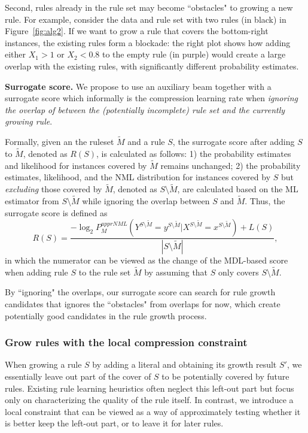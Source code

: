 Second, rules already in the rule set may become ``obstacles" to growing a new rule. For example, consider the data and rule set with two rules (in black) in Figure~\ref{fig:alg2}. If we want to grow a rule that covers the bottom-right instances, the existing rules form a blockade: the right plot shows how adding either $X_1 > 1$ or $X_2 < 0.8$ to the empty rule (in purple) would create a large overlap with the existing rules, with significantly different probability estimates.

\noindent \textbf{Surrogate score.}
We propose to use an auxiliary beam together with a surrogate score which informally is the compression learning rate when \emph{ignoring the overlap of between the (potentially incomplete) rule set and the currently growing rule}. 

Formally, given an the ruleset $\tilde{M}$ and a rule $S$, the surrogate score after adding $S$ to $\tilde{M}$, denoted as $R(S)$, is calculated as follows: 1) the probability estimates and likelihood for instances covered by $\tilde{M}$ remains unchanged; 2) the probability estimates, likelihood, and the NML distribution for instances covered by $S$ but \emph{excluding} those covered by $\tilde{M}$, denoted as $S \setminus \tilde{M}$, are calculated based on the ML estimator from $S \setminus \tilde{M}$ while ignoring the overlap between $S$ and $\tilde{M}$. Thus, the surrogate score is defined as 
\begin{equation} \label{eq:surrogate_learning_rate}
	R(S) = \frac{-\log_2 P_M^{apprNML}(Y^{S \setminus \tilde{M}} = y^{S \setminus \tilde{M}} | X^{S \setminus \tilde{M}} = x^{S \setminus \tilde{M}}) + L(S)} {|S \setminus \tilde{M}|},
\end{equation}
in which the numerator can be viewed as the change of the MDL-based score when adding rule $S$ to the rule set $\tilde{M}$ by assuming that $S$ only covers $S \setminus \tilde{M}$. 

By ``ignoring" the overlaps, our surrogate score can search for rule growth candidates that ignores the ``obstacles" from overlaps for now, which create potentially good candidates in the rule growth process. 

\subsubsection{Grow rules with the local compression constraint} \label{subsec:local_constraint}
When growing a rule $S$ by adding a literal and obtaining its growth result $S'$, we essentially leave out part of the cover of $S$ to be potentially covered by future rules. Existing rule learning heuristics often neglect this left-out part but focus only on characterizing the quality of the rule itself. In contrast, we introduce a local constraint that can be viewed as a way of approximately testing whether it is better keep the left-out part, or to leave it for later rules. 

